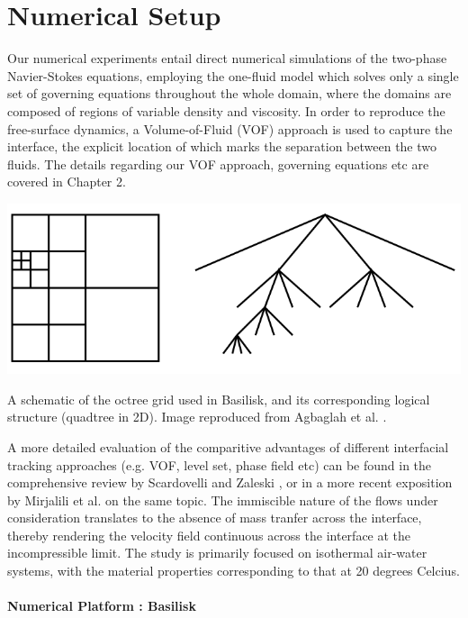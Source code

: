 \section{Numerical Setup}
Our numerical experiments entail direct numerical simulations of the two-phase
Navier-Stokes equations, employing the one-fluid model which  
solves only a single set of governing equations throughout the whole domain,
where the domains are composed of regions of variable density and viscosity. 
In order to reproduce the free-surface dynamics, a Volume-of-Fluid 
(VOF) approach is used to capture the interface, the explicit location 
of which marks the separation between the two fluids.
The details regarding our VOF approach, governing equations etc
are covered in Chapter 2. 

\begin{marginfigure}
\centering
\includegraphics{plots/ligament_breakup/octree.png}
\caption{A schematic of the octree grid used in Basilisk, and its
	corresponding logical structure (quadtree in 2D).
	Image reproduced from Agbaglah et al. \cite{agbag}.
	}
\label{octree}
\end{marginfigure}


A more detailed evaluation of the comparitive advantages of different  
interfacial tracking approaches (e.g. VOF, level set, phase field etc) 
can be found in the comprehensive review by Scardovelli and Zaleski 
\cite{zaleskiannual}, or in a more recent exposition by  
Mirjalili et al. \cite{mirjalili2017interface} on the same topic.
The immiscible nature of the flows under consideration translates to the 
absence of mass tranfer across the interface, thereby rendering the 
velocity field continuous across the interface at the incompressible limit. 
The study is primarily focused on isothermal air-water systems, with 
the material properties corresponding to that at 20 degrees Celcius. 

\paragraph{Numerical Platform : Basilisk}

